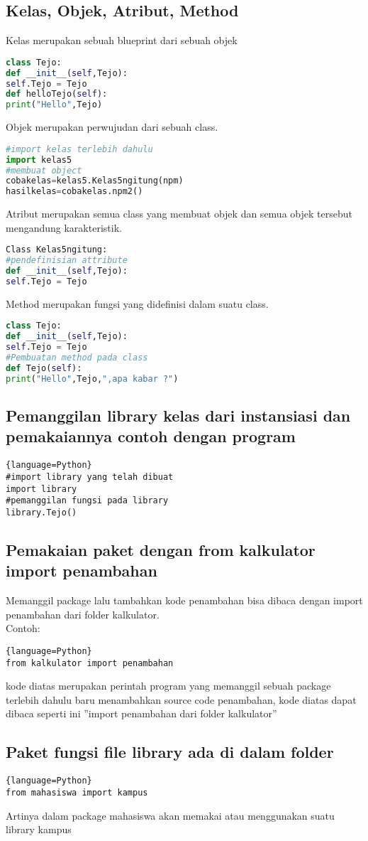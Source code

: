 \documentclass[a4paper, 12pt]{article}
\begin{document}
\subsection{Kelas, Objek, Atribut, Method}
\item Kelas merupakan sebuah blueprint dari sebuah objek
\begin{lstlisting}[language=Python]
class Tejo:
def __init__(self,Tejo):
self.Tejo = Tejo
def helloTejo(self):
print("Hello",Tejo)
\end{lstlisting}
\item  Objek merupakan perwujudan dari sebuah class.
\begin{lstlisting}[language=Python]
#import kelas terlebih dahulu
import kelas5
#membuat object
cobakelas=kelas5.Kelas5ngitung(npm) 
hasilkelas=cobakelas.npm2()
\end{lstlisting}
\item  Atribut merupakan semua class yang membuat objek dan semua objek tersebut mengandung karakteristik.
\begin{lstlisting}[language=Python]
Class Kelas5ngitung:
#pendefinisian attribute
def __init__(self,Tejo):
self.Tejo = Tejo
\end{lstlisting}
\item Method merupakan fungsi yang dideﬁnisi dalam suatu class.
\begin{lstlisting}[language=Python]
class Tejo:
def __init__(self,Tejo):
self.Tejo = Tejo
#Pembuatan method pada class
def Tejo(self):
print("Hello",Tejo,",apa kabar ?")
\end{lstlisting}

\subsection{Pemanggilan library kelas dari instansiasi dan pemakaiannya contoh dengan program}
\begin{lstlisting}{language=Python}
#import library yang telah dibuat
import library
#pemanggilan fungsi pada library
library.Tejo()
\end{lstlisting}

\subsection{Pemakaian paket dengan from kalkulator import penambahan}
Memanggil package lalu tambahkan kode penambahan bisa dibaca dengan import penambahan dari folder kalkulator. \\
Contoh:
\begin{lstlisting}{language=Python}
from kalkulator import penambahan
\end{lstlisting}
kode diatas merupakan perintah program yang memanggil sebuah package terlebih dahulu baru menambahkan source code penambahan, kode diatas dapat dibaca seperti ini ”import penambahan dari folder kalkulator”


\subsection{Paket fungsi ﬁle library ada di dalam folder}
\begin{lstlisting}{language=Python}
from mahasiswa import kampus
\end{lstlisting}
Artinya dalam package mahasiswa akan memakai atau menggunakan suatu library kampus
\end{document}

